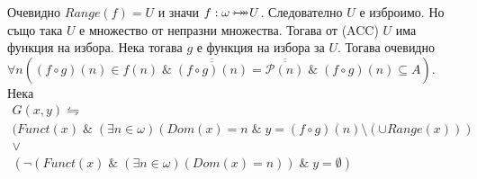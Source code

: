 \documentclass[12pt]{article}
\newcommand{\bijection}[0]{\mathbin{\mathlarger{\mathlarger{\rightarrowtail}} \hspace{-14pt} \mathlarger{\mathlarger{\twoheadrightarrow}}}}
\begin{document}
Очевидно \(Range(f) = U\) и значи \(f : \omega \bijection U\).
Следователно \(U\) е изброимо. Но също така \(U\) е множество от непразни множества.
Тогава от (ACC) \(U\) има функция на избора.
Нека тогава \(g\) е функция на избора за \(U\).
Тогава очевидно \(\forall n ((f \circ g)(n) \in f(n) \; \& \; \overline{\overline{(f \circ g)(n)}} = \overline{\overline{\mathcal{P}(n)}} \; \& \; (f \circ g)(n) \subseteq A)\).
Нека
\begin{align*}
    G(x, y) \leftrightharpoons \\
        (Funct(x) \; \& \; (\exists n \in \omega)(Dom(x) = n \; \& \; y = (f \circ g)(n) \setminus (\cup Range(x))) \\
        \lor \\
        (\lnot (Funct(x) \; \& \; (\exists n \in \omega)(Dom(x) = n)) \; \& \; y = \emptyset)
\end{align*}
\end{document}
